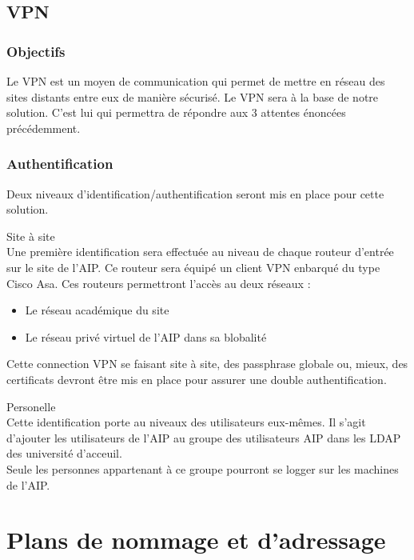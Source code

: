 \documentclass[a4paper]{article}
\begin{document}
\subsection{VPN}

\subsubsection{Objectifs}
Le VPN est un moyen de communication qui permet de mettre en réseau des sites distants entre eux de manière sécurisé.
Le VPN sera à la base de notre solution. C'est lui qui permettra de répondre aux 3 attentes énoncées précédemment.

\subsubsection{Authentification}

Deux niveaux d'identification/authentification seront mis en place pour cette solution.
\begin{description}
\item{Site à site} \\
Une première identification sera effectuée au niveau de chaque routeur d'entrée sur le site de l'AIP. Ce routeur sera équipé un client VPN enbarqué du type Cisco Asa. Ces routeurs permettront l'accès au deux réseaux : 
\begin{itemize}
\item Le réseau académique du site
\item Le réseau privé virtuel de l'AIP dans sa blobalité
\end{itemize}
Cette connection VPN se faisant site à site, des passphrase globale ou, mieux, des certificats devront être mis en place pour assurer une double authentification.
\item{Personelle} \\
Cette identification porte au niveaux des utilisateurs eux-mêmes. Il s'agit d'ajouter les utilisateurs de l'AIP au groupe des utilisateurs AIP dans les LDAP des université d'acceuil.\\
Seule les personnes appartenant à ce groupe pourront se logger sur les machines de l'AIP.

\end{description}

	
\section{Plans de nommage et d'adressage}
\end{document}
